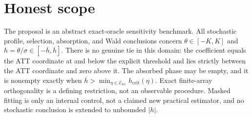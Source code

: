 \documentclass{article}
\begin{document}
\section{Honest scope}

The proposal is an abstract exact-oracle sensitivity benchmark.  All stochastic profile, selection, absorption, and Wald conclusions concern \(\theta\in[-K,K]\) and \(h=\theta/\sigma\in[-\overline h,\overline h]\).  There is no genuine tie in this domain: the coefficient equals the ATT coordinate at and below the explicit threshold and lies strictly between the ATT coordinate and zero above it.  The absorbed phase may be empty, and it is nonempty exactly when \(\overline h>\min_{\eta\in\mathcal E_{\mathrm{loc}}}h_{\mathrm{crit}}(\eta)\).  Exact finite-array orthogonality is a defining restriction, not an observable procedure.  Masked fitting is only an internal control, not a claimed new practical estimator, and no stochastic conclusion is extended to unbounded \(|h|\).
\end{document}
